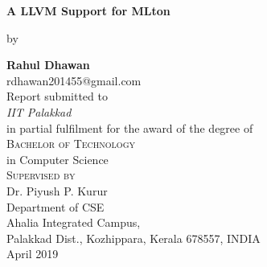 \documentclass{book}
\begin{document}
\begin{titlepage}
\begin{center}
 {\huge\bfseries A LLVM Support for MLton \\}
 
 \vspace{1.5cm}
 by
 \vspace{0.02cm}
 
 \vspace{1.0cm}
 {\Large\bfseries Rahul Dhawan}\\[5pt]
 rdhawan201455@gmail.com\\[14pt]
 \vspace{2cm}
{Report  submitted to} \\[5pt]
\emph{{IIT Palakkad}}\\[2cm]
{in partial fulfilment for the award of the degree
 of} \\[2cm]
\textsc{\Large{{Bachelor of Technology }}} \\[5pt]
{in Computer Science} \vspace{0.4cm} \\[1cm]

\textsc{\Large{{Supervised by}}}   \\[5pt]
{Dr. Piyush P. Kurur} \vspace{0.4cm} \\[2cm]

 \vfill
{Department of CSE}\\[5pt]
{Ahalia Integrated Campus,}\\[5pt]
{ Palakkad Dist., Kozhippara, Kerala 678557,
 INDIA}\\
 \vfill
{April 2019}
\end{center}
\end{titlepage}
\end{document}
